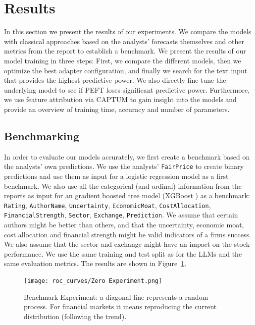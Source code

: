 \documentclass[conference]{IEEEtran}
\begin{document}
\section{Results}%
In this section we present the results of our experiments. We compare the models with classical approaches based on the analysts' forecasts themselves and other metrics from the report to establish a benchmark. We present the results of our model training in three steps: First, we compare the different models, then we optimize the best adapter configuration, and finally we search for the text input that provides the highest predictive power. We also directly fine-tune the underlying model to see if PEFT loses significant predictive power. Furthermore, we use feature attribution via CAPTUM to gain insight into the models and provide an overview of training time, accuracy and number of parameters.

\subsection{Benchmarking}%
In order to evaluate our models accurately, we first create a benchmark based on the analysts' own predictions. We use the analysts' \texttt{FairPrice} to create binary predictions and use them  as input for a logistic regression model as a first benchmark. We also use all the categorical (and ordinal) information from the reports as input for an gradient boosted tree model (XGBoost \cite{Russell2021}) as a benchmark: \texttt{Rating}, \texttt{AuthorName}, \texttt{Uncertainty}, \texttt{EconomicMoat}, \texttt{CostAllocation}, \texttt{FinancialStrength}, \texttt{Sector}, \texttt{Exchange}, \texttt{Prediction}. We assume that certain authors might be better than others, and that the uncertainty, economic moat, cost allocation and financial strength might be valid indicators of a firms success. We also assume that the sector and exchange might have an impact on the stock performance. We use the same training and test split as for the LLMs and the same evaluation metrics. The results are shown in Figure~\ref{fig:Zeroexp}.

\begin{figure}[H]
    \centering
    \texttt{[image: roc\_curves/Zero Experiment.png]}
    \caption[First Experiment]{Benchmark Experiment: a diagonal line represents a random process. For financial markets it means reproducing the current distribution (following the trend).}
    \label{fig:Zeroexp}
\end{figure}
\end{document}

